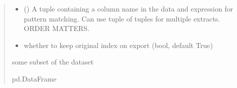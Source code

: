 \documentclass[letterpaper,10pt,english]{sphinxmanual}
\begin{document}
\begin{fulllineitems}
\begin{quote}
\begin{description}
\begin{itemize}
\item {} 
\sphinxAtStartPar
{} (\sphinxstyleliteralemphasis{\sphinxupquote{{[}}}\sphinxstyleliteralemphasis{\sphinxupquote{{[}}}\sphinxstyleliteralemphasis{\sphinxupquote{, }}\sphinxstyleliteralemphasis{\sphinxupquote{{[}}}\sphinxstyleliteralemphasis{\sphinxupquote{, }}\sphinxstyleliteralemphasis{\sphinxupquote{, }}\sphinxstyleliteralemphasis{\sphinxupquote{{]}}}\sphinxstyleliteralemphasis{\sphinxupquote{{]}}}\sphinxstyleliteralemphasis{\sphinxupquote{, }}\sphinxstyleliteralemphasis{\sphinxupquote{{[}}}\sphinxstyleliteralemphasis{\sphinxupquote{, }}\sphinxstyleliteralemphasis{\sphinxupquote{{[}}}\sphinxstyleliteralemphasis{\sphinxupquote{, }}\sphinxstyleliteralemphasis{\sphinxupquote{, }}\sphinxstyleliteralemphasis{\sphinxupquote{{]}}}\sphinxstyleliteralemphasis{\sphinxupquote{{]}}}\sphinxstyleliteralemphasis{\sphinxupquote{{]}}}) \textendash{} A tuple containing a column name in the data and expression for pattern matching. Can use tuple of tuples for multiple extracts. ORDER MATTERS.

\item {} 
\sphinxAtStartPar
{} \textendash{} whether to keep original index on export (bool, default True)

\end{itemize}

\sphinxAtStartPar
some subset of the dataset

\sphinxAtStartPar
pd.DataFrame

\end{description}\end{quote}

\end{fulllineitems}

\end{document}
